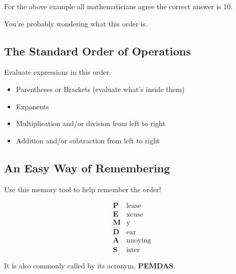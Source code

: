 For the above example all mathematicians agree the correct answer is 10.



You're probably wondering what this order is.




\subsection{The Standard Order of Operations}
\label{sss:thes-d624}




Evaluate expressions in this order.



\begin{itemize}
    \item Parentheses or Brackets (evaluate what's inside them)
    \item Exponents
    \item Multiplication and/or division from left to right
    \item Addition and/or subtraction from left to right
\end{itemize}


\subsection{An Easy Way of Remembering}
\label{sss:anea-0ff5}




Use this memory tool to help remember the order!

 \begin{align}
 \textbf{P} &\text{lease}  \\ 
 \textbf{E} &\text{xcuse} \\ 
 \textbf{M} &\text{y} \\ 
 \textbf{D} &\text{ear} \\ 
 \textbf{A} &\text{nnoying} \\ 
 \textbf{S} &\text{ister}
 \end{align}

 It is also commonly called by its acronym, \textbf{PEMDAS}.



